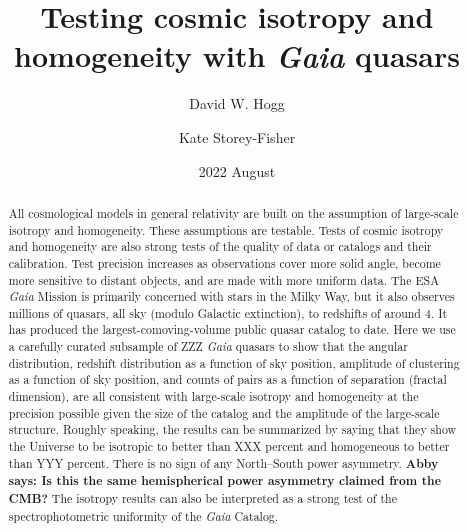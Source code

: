 \documentclass[modern]{aastex631}
\newcommand{\abby}[1]{\textbf{Abby says: #1}}
\begin{document}
\title{%
Testing cosmic isotropy and homogeneity
with \textsl{Gaia} quasars}
\author[0000-0003-2866-9403]{David W. Hogg}

\author[0000-0001-8764-7103]{Kate Storey-Fisher}

\date{2022 August}

\begin{abstract}\noindent
All cosmological models in general relativity are built on the assumption of large-scale isotropy and homogeneity.
These assumptions are testable.
Tests of cosmic isotropy and homogeneity are also strong tests of the quality of data or catalogs and their calibration.
Test precision increases as observations cover more solid angle, become more sensitive to distant objects, and are made with more uniform data.
The ESA \textsl{Gaia} Mission is primarily concerned with stars in the Milky Way, but it also observes millions of quasars, all sky (modulo Galactic extinction), to redshifts of around $4$.
It has produced the largest-comoving-volume public quasar catalog to date.
Here we use a carefully curated subsample of ZZZ \textsl{Gaia} quasars to show that the angular distribution, redshift distribution as a function of sky position, amplitude of clustering as a function of sky position, and counts of pairs as a function of separation (fractal dimension), are all consistent with large-scale isotropy and homogeneity at the precision possible given the size of the catalog and the amplitude of the large-scale structure.
Roughly speaking, the results can be summarized by saying that they show the Universe to be isotropic to better than XXX percent and homogeneous to better than YYY percent.
There is no sign of any North--South power asymmetry.
\abby{Is this the same hemispherical power asymmetry claimed from the CMB?}
The isotropy results can also be interpreted as a strong test of the spectrophotometric uniformity of the \textsl{Gaia} Catalog.
\end{abstract}

\section*{}
\clearpage
\end{document}
